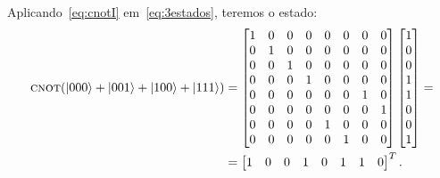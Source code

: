 Aplicando~\eqref{eq:cnotI} em~\eqref{eq:3estados}, teremos o estado:
\begin{equation}\label{eq:cnot3estados}
	\begin{split}
		\operatorname{\textsc{cnot}} (\ket{000}+\ket{001}+\ket{100}+\ket{111}) &= \begin{bmatrix}
		1 & 0 & 0 & 0 & 0 & 0 & 0 & 0 \\
		0 & 1 & 0 & 0 & 0 & 0 & 0 & 0 \\
		0 & 0 & 1 & 0 & 0 & 0 & 0 & 0 \\
		0 & 0 & 0 & 1 & 0 & 0 & 0 & 0 \\
		0 & 0 & 0 & 0 & 0 & 0 & 1 & 0 \\
		0 & 0 & 0 & 0 & 0 & 0 & 0 & 1 \\
		0 & 0 & 0 & 0 & 1 & 0 & 0 & 0 \\
		0 & 0 & 0 & 0 & 0 & 1 & 0 & 0 		
		\end{bmatrix} \begin{bmatrix}
		1 \\
		0 \\
		0 \\
		1 \\
		1 \\
		0 \\
		0 \\
		1
		\end{bmatrix} = \\
		&=\begin{bmatrix}
		1 & 0 &	0 & 1 &	0 &	1 &	1 &	0
		\end{bmatrix}^T.
	\end{split}
\end{equation}

